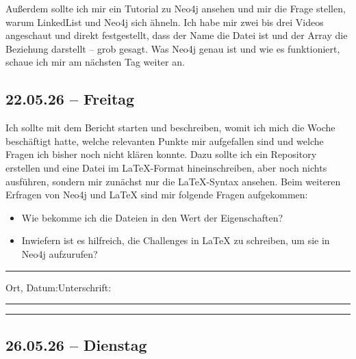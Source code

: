 Außerdem sollte ich mir ein Tutorial zu Neo4j ansehen und mir die Frage stellen, warum LinkedList und Neo4j sich ähneln.
Ich habe mir zwei bis drei Videos angeschaut und direkt festgestellt, dass der Name die Datei ist und der Array die Beziehung darstellt -- grob gesagt. Was Neo4j genau ist und wie es funktioniert, schaue ich mir am nächsten Tag weiter an.

\subsection{22.05.26 -- Freitag}

Ich sollte mit dem Bericht starten und beschreiben, womit ich mich die Woche beschäftigt hatte, welche relevanten Punkte mir aufgefallen sind und welche Fragen ich bisher noch nicht klären konnte.
Dazu sollte ich ein Repository erstellen und eine Datei im LaTeX-Format hineinschreiben, aber noch nichts ausführen, sondern mir zunächst nur die LaTeX-Syntax ansehen.
Beim weiteren Erfragen von Neo4j und LaTeX sind mir folgende Fragen aufgekommen:

\begin{itemize}
    \item Wie bekomme ich die Dateien in den Wert der Eigenschaften?
    \item Inwiefern ist es hilfreich, die Challenges in LaTeX zu schreiben, um sie in Neo4j aufzurufen?
\end{itemize}

\vfill
\noindent\rule{\linewidth}{0.2pt}

\noindent Ort, Datum:\hfill Unterschrift:\\[0.5cm]
\noindent \rule{6cm}{0.9pt}\hfill \rule{6cm}{0.9pt}
\newpage


\vspace*{-2cm}

\subsection{26.05.26 -- Dienstag}


